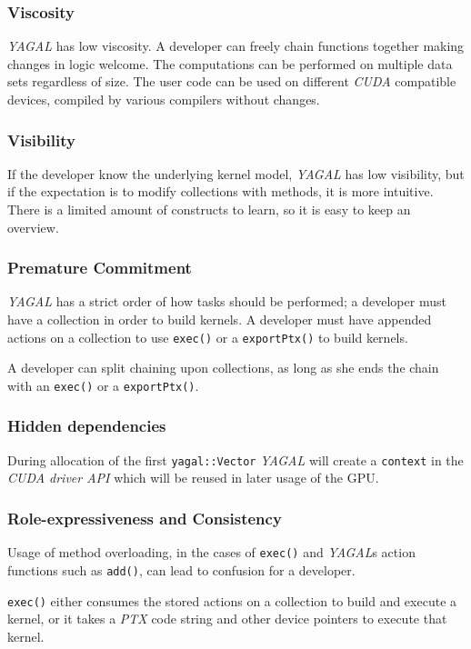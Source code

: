 \subsubsection[*]{Viscosity}
\textit{YAGAL} has low viscosity. A developer can freely chain functions together making changes in logic welcome. The computations can be performed on multiple data sets regardless of size. The user code can be used on different \textit{CUDA} compatible devices, compiled by various compilers without changes.

\subsubsection[*]{Visibility}
If the developer know the underlying kernel model, \textit{YAGAL} has low visibility, but if the expectation is to modify collections with methods, it is more intuitive. There is a limited amount of constructs to learn, so it is easy to keep an overview.

\subsubsection[*]{Premature Commitment}
\textit{YAGAL} has a strict order of how tasks should be performed; a developer must have a collection in order to build kernels. A developer must have appended actions on a collection to use \texttt{exec()} or a \texttt{exportPtx()} to build kernels. 

A developer can split chaining upon collections, as long as she ends the chain with an \texttt{exec()} or a \texttt{exportPtx()}.

\subsubsection[*]{Hidden dependencies}
During allocation of the first \texttt{yagal::Vector} \textit{YAGAL} will create a \texttt{context} in the \textit{CUDA driver API} which will be reused in later usage of the GPU. 

\subsubsection[*]{Role-expressiveness and Consistency}
Usage of method overloading, in the cases of \texttt{exec()} and \textit{YAGAL}s action functions such as \texttt{add()}, can lead to confusion for a developer. 

\texttt{exec()} either consumes the stored actions on a collection to build and execute a kernel, or it takes a \textit{PTX} code string and other device pointers to execute that kernel.

